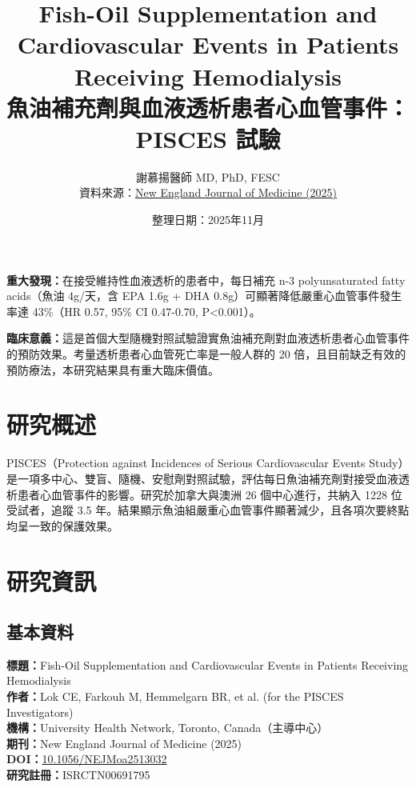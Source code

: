 \documentclass[12pt,a4paper]{article}
\title{\textbf{Fish-Oil Supplementation and Cardiovascular Events in Patients Receiving Hemodialysis\\
魚油補充劑與血液透析患者心血管事件：PISCES 試驗}}
\author{謝慕揚醫師 MD, PhD, FESC\\
資料來源：\href{https://doi.org/10.1056/NEJMoa2513032}{New England Journal of Medicine (2025)}}
\date{整理日期：2025年11月}
\begin{document}
\maketitle

\begin{tcolorbox}[colback=yellow!10!white,colframe=orange!75!black,title=核心發現摘要]
\textbf{重大發現：}在接受維持性血液透析的患者中，每日補充 n-3 polyunsaturated fatty acids（魚油 4g/天，含 EPA 1.6g + DHA 0.8g）可顯著降低嚴重心血管事件發生率達 43\%（HR 0.57, 95\% CI 0.47-0.70, P<0.001）。

\textbf{臨床意義：}這是首個大型隨機對照試驗證實魚油補充劑對血液透析患者心血管事件的預防效果。考量透析患者心血管死亡率是一般人群的 20 倍，且目前缺乏有效的預防療法，本研究結果具有重大臨床價值。
\end{tcolorbox}

\tableofcontents
\newpage

\section{研究概述}

PISCES（Protection against Incidences of Serious Cardiovascular Events Study）是一項多中心、雙盲、隨機、安慰劑對照試驗，評估每日魚油補充劑對接受血液透析患者心血管事件的影響。研究於加拿大與澳洲 26 個中心進行，共納入 1228 位受試者，追蹤 3.5 年。結果顯示魚油組嚴重心血管事件顯著減少，且各項次要終點均呈一致的保護效果。

\section{研究資訊}

\subsection{基本資料}

\textbf{標題：}Fish-Oil Supplementation and Cardiovascular Events in Patients Receiving Hemodialysis\\
\textbf{作者：}Lok CE, Farkouh M, Hemmelgarn BR, et al. (for the PISCES Investigators)\\
\textbf{機構：}University Health Network, Toronto, Canada（主導中心）\\
\textbf{期刊：}New England Journal of Medicine (2025)\\
\textbf{DOI：}\href{https://doi.org/10.1056/NEJMoa2513032}{10.1056/NEJMoa2513032}\\
\textbf{研究註冊：}ISRCTN00691795
\end{document}
